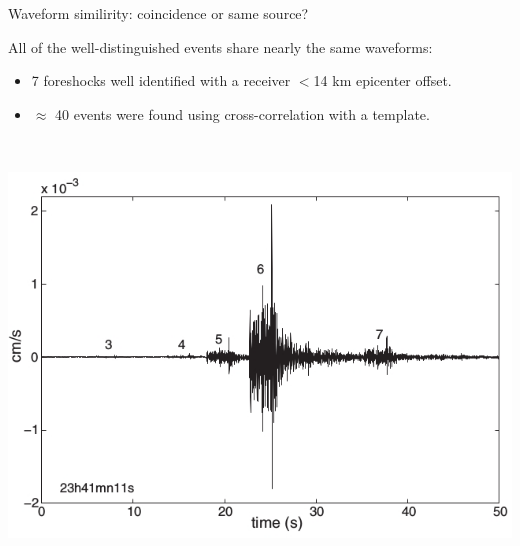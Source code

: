 \documentclass[aspectratio=43,9pt]{beamer}
\begin{document}
\begin{frame}{Waveform similirity: coincidence or same source?}
 
 \begin{minipage}{0.45\linewidth}
 All of the well-distinguished events share nearly the same waveforms:
 \begin{itemize}
  \item  7 foreshocks well identified with a receiver $<$14 km epicenter offset.
  \item $\approx$ 40 events were found using cross-correlation with a template.
 \end{itemize}

 \end{minipage} \,
 \begin{minipage}{0.5\linewidth}
  \includegraphics[width=1\linewidth]{Figs/fig1.jpg}
 \end{minipage}


\end{frame}
\end{document}
